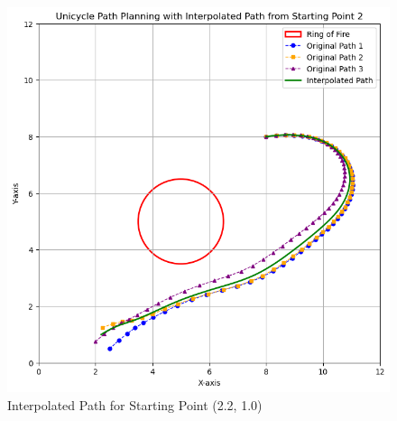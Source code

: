 \documentclass[conference,onecolumn]{IEEEtran}
\begin{document}
\begin{enumerate}[label=\arabic{enumi}.]
\begin{enumerate}
                    \begin{figure}[H]
                        \centering
                        \includegraphics[width=.99\linewidth]{"figs/Q8_path_2.png"}
                        \caption{Interpolated Path for Starting Point (2.2, 1.0)}
                    \end{figure}


\end{enumerate}
\end{enumerate}
\end{document}
